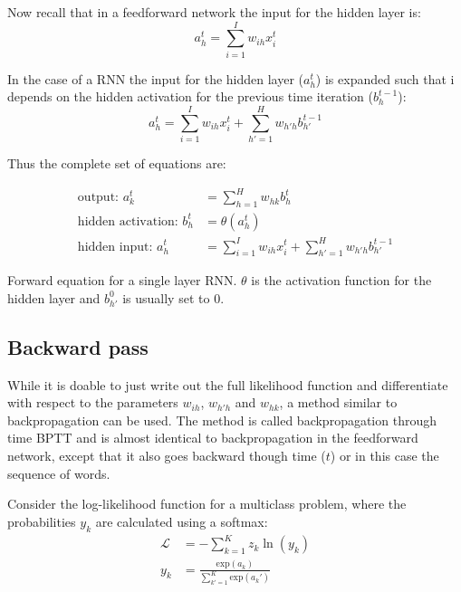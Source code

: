 Now recall that in a feedforward network the input for the hidden layer is:
\begin{equation}
a_h^t = \sum_{i=1}^I w_{i h} x_i^t
\end{equation}

In the case of a RNN the input for the hidden layer ($a_h^t$) is expanded such that i depends on the hidden activation for the previous time iteration ($b_h^{t-1}$):
\begin{equation}
a_h^t = \sum_{i=1}^I w_{i h} x_i^t + \sum_{h'=1}^H w_{h' h} b_{h'}^{t-1}
\end{equation}

Thus the complete set of equations are:
\begin{equationbox}[H]
\begin{equation*}
\begin{aligned}
\text{output: } a_k^t &= \sum_{h=1}^H w_{h k} b_h^t \\
\text{hidden activation: } b_h^t &= \theta(a_h^t) \\
\text{hidden input: } a_h^t &= \sum_{i=1}^I w_{i h} x_i^t + \sum_{h'=1}^H w_{h' h} b_{h'}^{t-1}
\end{aligned}
\end{equation*}
\caption{Forward equation for a single layer RNN. $\theta$ is the activation function for the hidden layer and $b_{h'}^{0}$ is usually set to $0$.}
\end{equationbox}

\subsection{Backward pass}

While it is doable to just write out the full likelihood function and differentiate with respect to the parameters $w_{i h}$, $w_{h' h}$ and $w_{h k}$, a method similar to backpropagation can be used. The method is called backpropagation through time BPTT and is almost identical to backpropagation in the feedforward network, except that it also goes backward though time ($t$) or in this case the sequence of words.

Consider the log-likelihood function for a multiclass problem, where the probabilities $y_k$ are calculated using a softmax:
\begin{equation}
\begin{aligned}
\mathcal{L} &= - \sum_{k=1}^K z_k \ln(y_k) \\
y_k &= \frac{\mathrm{exp}(a_k)} {\sum_{k'=1}^K \mathrm{exp}(a_k')}
\end{aligned}
\end{equation}

